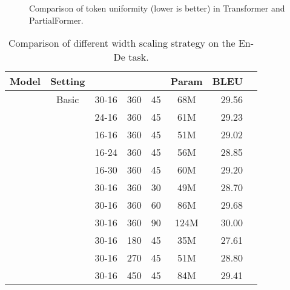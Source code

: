 \documentclass[11pt]{article}
\begin{document}
\begin{figure}[ht!]
\vskip -0.1in
    \caption{Comparison of token uniformity (lower is better) in Transformer and PartialFormer. }
    \label{fig:analysis_tu}
\end{figure} 



\begin{table}[t!]
    \centering
    \renewcommand{\arraystretch}{1}
\centering
\small
\setlength{\tabcolsep}{2pt}

\begin{tabular}{l|c|ccccrc}
\toprule
\bf Model & \bf Setting &  &  &  & \bf Param & \bf BLEU \\

\midrule
{} & Basic &30-16& 360 & 45 &68M & 29.56 \\
\cmidrule(r){2-7}
  &&24-16& 360 & 45 &61M & 29.23 \\
  &&16-16& 360 & 45 &51M & 29.02 \\
\cmidrule(r){2-7}
&&16-24& 360 & 45 &56M & 28.85 \\
  &&16-30& 360 & 45 & 60M & 29.20 \\
\cmidrule(r){2-7}
  &&30-16& 360 & 30 & 49M &  28.70 \\
  &&30-16& 360 & 60 & 86M & 29.68 \\
  &&30-16& 360 & 90 & 124M & 30.00 \\
\cmidrule(r){2-7}
&&30-16& 180 & 45 &35M & 27.61 \\
  &&30-16& 270 & 45 &51M & 28.80 \\
 &&30-16& 450 & 45 & 84M & 29.41 \\
\bottomrule
\end{tabular}
\caption{Comparison of different width scaling strategy on the En-De task.}
\label{tab:PartialFormer_parameter_analysis}
\end{table}
\end{document}
